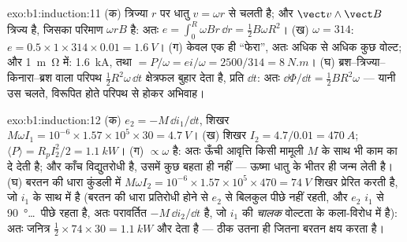 \begin{solution}{exo:b1:induction:11}
(क) त्रिज्या $r$ पर धातु $v = \omega r$ से चलती है; और $\vect v\wedge\vect B$
त्रिज्य है, जिसका परिमाण $\omega rB$ है: अतः $e = \int_0^R\omega Br\,\dd r = \tfrac12B\omega R^2$।
(ख) $\omega = 314$: $e = 0.5 \times 1 \times 314 \times 0.01 = \qty{1.6}{V}$। (ग) केवल
एक ही ``फेरा'', अतः अधिक से अधिक कुछ वोल्ट; और \qty{1}{m\ohm} में: \qty{1.6}{kA},
तथा  $= P/\omega = ei/\omega = 2500/314 = \qty{8}{N.m}$। (घ) ब्रश--त्रिज्या--
किनारा--ब्रश वाला परिपथ $\tfrac12R^2\omega\,\dd t$ क्षेत्रफल बुहार देता है,
प्रति $\dd t$: अतः $\dd\Phi/\dd t =
\tfrac12BR^2\omega$ --- यानी उस चलते, विरूपित होते परिपथ से होकर अभिवाह।
\end{solution}

\begin{solution}{exo:b1:induction:12}
(क) $e_2 = -M\,\dd i_1/\dd t$, शिखर $M\omega I_1 = 10^{-6} \times 1.57 \times 10^5 \times 30 =
\qty{4.7}{V}$। (ख) शिखर $I_2 = 4.7/0.01 = \qty{470}{A}$; $\langle P\rangle = R_pI_2^2/2
= \qty{1.1}{kW}$। (ग)  $\propto\omega$ है: अतः ऊँची आवृत्ति किसी
मामूली $M$ के साथ भी काम का  दे देती है; और काँच विद्युतरोधी
है, उसमें कुछ बहता ही नहीं --- ऊष्मा धातु के भीतर ही जन्म लेती है। (घ) बरतन
की धारा कुंडली में $M\omega I_2 = 10^{-6} \times 1.57 \times 10^5 \times 470 = \qty{74}{V}$ शिखर
प्रेरित करती है, जो $i_1$ के साथ  में है (बरतन की धारा प्रतिरोधी होने से
$e_2$ से बिलकुल पीछे नहीं रहती, और $e_2$ $i_1$ से \qty{90}{\degree}\ldots\ पीछे
रहता है, अतः परावर्तित  $-M\,\dd i_2/\dd t$ है, जो $i_1$ की
\emph{चालक} वोल्टता के कला-विरोध में है): अतः जनित्र $\tfrac12 \times 74 \times 30 =
\qty{1.1}{kW}$ और देता है --- ठीक उतना ही जितना बरतन क्षय करता है।
\end{solution}

